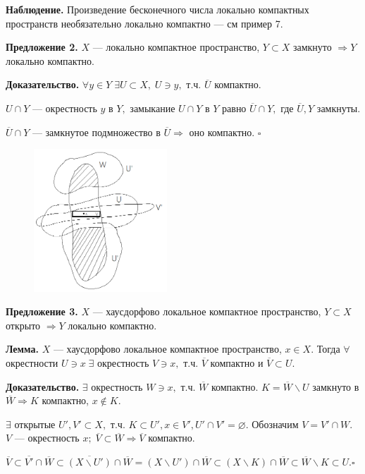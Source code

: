 \documentclass[12pt,a4paper]{article}
\begin{document}
\textbf{Наблюдение.} Произведение бесконечного числа локально компактных пространств необязательно локально компактно --- см пример 7.

\textbf{Предложение 2.} $X$ --- локально компактное пространство, $Y \subset X$ замкнуто $\Rightarrow Y$ локально компактно. 

\textbf{Доказательство.} $\forall y \in Y \; \exists U \subset X, \; U \ni y,$ т.ч. $\overline{U}$ компактно.

$U \cap Y$ --- окрестность $y$ в $Y,$ замыкание $U \cap Y$ в $Y$ равно $\overline{U} \cap Y,$ где $\overline{U}, Y$ замкнуты. 

$\overline{U} \cap Y$ --- замкнутое подмножество в $\overline{U} \Rightarrow$ оно компактно. $\square$

\begin{figure}
	\includegraphics[width = 5cm]{lect10_2.png}
\end{figure}

\textbf{Предложение 3.} $X$ --- хаусдорфово локальное компактное пространство, $Y \subset X$ открыто $\Rightarrow Y$ локально компактно. 

\textbf{Лемма.} $X$ --- хаусдорфово локальное компактное пространство, $x \in X.$ Тогда $\forall$ окрестности $U \ni x \; \exists$ окрестность $V \ni x,$ т.ч. $\overline{V}$ компактно и $\overline{V} \subset U.$ 

\textbf{Доказательство.} $\exists$ окрестность $W \ni x,$ т.ч. $\overline{W}$ компактно. $K = \overline{W} \backslash U$ замкнуто в $\overline{W} \Rightarrow K$ компактно, $x \not \in K.$

$\exists$ открытые $U', V' \subset X,$ т.ч. $K \subset U', x \in V', U' \cap V' = \varnothing.$ Обозначим $V = V' \cap W.$ $V$ --- окрестность $x; \; \overline{V} \subset \overline{W} \Rightarrow \overline{V}$ компактно. 

$\overline{V} \subset \overline{V'} \cap \overline{W} \subset \overline{(X \backslash U')} \cap \overline{W} = (X \backslash U') \cap \overline{W} \subset (X \backslash K) \cap \overline{W} \subset \overline{W} \backslash K \subset U. \square$
\end{document}
